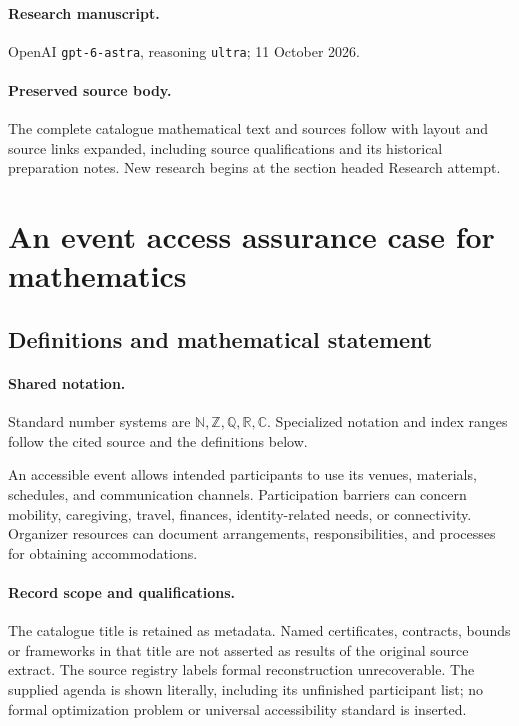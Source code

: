 \documentclass[11pt]{article}
\begin{document}
\paragraph{Research manuscript.} OpenAI \texttt{gpt-6-astra}, reasoning \texttt{ultra}; 11 October 2026.
\paragraph{Preserved source body.} The complete catalogue mathematical text and sources follow with layout and source links expanded, including source qualifications and its historical preparation notes. New research begins at the section headed Research attempt.

\section{An event access assurance case for mathematics}\label{statement}

\subsection{Definitions and mathematical statement}

\paragraph{Shared notation.}Standard number systems are $\mathbb N,\mathbb Z,\mathbb Q,\mathbb R,\mathbb C$. Specialized notation and index ranges follow the cited source and the definitions below.


An accessible event allows intended participants to use its venues, materials, schedules, and communication channels. Participation barriers can concern mobility, caregiving, travel, finances, identity-related needs, or connectivity. Organizer resources can document arrangements, responsibilities, and processes for obtaining accommodations.
\paragraph{Record scope and qualifications.}
The catalogue title is retained as metadata. Named certificates, contracts, bounds or frameworks in that title are not asserted as results of the original source extract.
The source registry labels formal reconstruction unrecoverable. The supplied agenda is shown literally, including its unfinished participant list; no formal optimization problem or universal accessibility standard is inserted.
\end{document}
